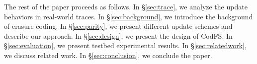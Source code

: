
The rest of the paper proceeds as follows. In \S\ref{sec:trace}, we analyze
the update behaviors in real-world traces.  In \S\ref{sec:background}, we
introduce the background of erasure coding. In \S\ref{sec:parity}, we present
different update schemes and describe our approach. In
\S\ref{sec:design}, we present the design of CodFS.  In
\S\ref{sec:evaluation}, we present testbed experimental results. 
In \S\ref{sec:relatedwork}, we discuss related work.
In \S\ref{sec:conclusion}, we conclude the paper.



